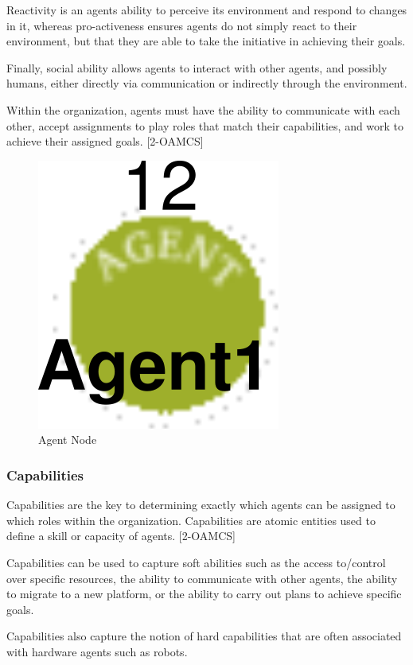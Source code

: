 Reactivity is an agents ability to perceive its environment and respond to changes in it, whereas
pro-activeness ensures agents do not simply react to their environment, but that they are able to
take the initiative in achieving their goals. 

Finally, social ability allows agents to interact with
other agents, and possibly humans, either directly via communication or indirectly through the
environment.

Within the organization, agents must have the ability to communicate with each other, accept
assignments to play roles that match their capabilities, and work to achieve their assigned goals. [2-OAMCS]

\begin{figure}[th]
	\centering
		\includegraphics{chapiter1/img/Agent}
	\caption{\label{fig:Agent Node}Agent Node }
\end{figure}

\subsubsection{ Capabilities } 

Capabilities are the key to determining exactly which agents can be assigned to which roles
within the organization. Capabilities are atomic entities used to define a skill or capacity of
agents. [2-OAMCS]

Capabilities can be used to capture soft abilities such as the access to/control over specific
resources, the ability to communicate with other agents, the ability to migrate to a new platform,
or the ability to carry out plans to achieve specific goals. 

Capabilities also capture the notion of hard capabilities that are often associated 
with hardware agents such as robots. 

